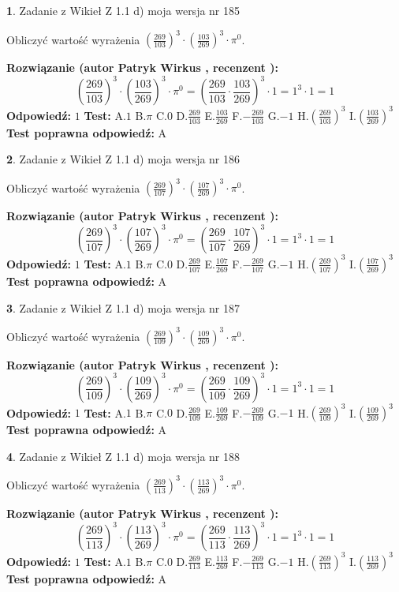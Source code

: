 \documentclass[12pt, a4paper]{article}
\theoremstyle{definition} %
\newtheorem{zad}{}
\newcommand{\zadStart}[1]{\begin{zad}#1\newline}
\newcommand{\zadStop}{\end{zad}}
\newcommand{\rozwStart}[2]{\noindent \textbf{Rozwiązanie (autor #1 , recenzent #2): }\newline}
\newcommand{\rozwStop}{\newline}
\newcommand{\odpStart}{\noindent \textbf{Odpowiedź:}\newline}
\newcommand{\odpStop}{\newline}
\newcommand{\testStart}{\noindent \textbf{Test:}\newline}
\newcommand{\testStop}{\newline}
\newcommand{\kluczStart}{\noindent \textbf{Test poprawna odpowiedź:}\newline}
\newcommand{\kluczStop}{\newline}
\begin{document}
\zadStart{Zadanie z Wikieł Z 1.1 d) moja wersja nr 185}

Obliczyć wartość wyrażenia $(\frac{269}{103})^{3} \cdot (\frac{103}{269})^{3} \cdot \pi^{0}$.
\zadStop
\rozwStart{Patryk Wirkus}{}
$$(\frac{269}{103})^{3} \cdot (\frac{103}{269})^{3} \cdot \pi^{0} = (\frac{269}{103} \cdot \frac{103}{269})^{3} \cdot 1 = 1^{3} \cdot 1 = 1$$
\rozwStop
\odpStart
$1$
\odpStop
\testStart
A.$1$ B.$\pi$ C.$0$ D.$\frac{269}{103}$ E.$\frac{103}{269}$
F.$-\frac{269}{103}$ G.$-1$
H.$(\frac{269}{103})^{3}$
I.$(\frac{103}{269})^{3}$
\testStop
\kluczStart
A
\kluczStop



\zadStart{Zadanie z Wikieł Z 1.1 d) moja wersja nr 186}

Obliczyć wartość wyrażenia $(\frac{269}{107})^{3} \cdot (\frac{107}{269})^{3} \cdot \pi^{0}$.
\zadStop
\rozwStart{Patryk Wirkus}{}
$$(\frac{269}{107})^{3} \cdot (\frac{107}{269})^{3} \cdot \pi^{0} = (\frac{269}{107} \cdot \frac{107}{269})^{3} \cdot 1 = 1^{3} \cdot 1 = 1$$
\rozwStop
\odpStart
$1$
\odpStop
\testStart
A.$1$ B.$\pi$ C.$0$ D.$\frac{269}{107}$ E.$\frac{107}{269}$
F.$-\frac{269}{107}$ G.$-1$
H.$(\frac{269}{107})^{3}$
I.$(\frac{107}{269})^{3}$
\testStop
\kluczStart
A
\kluczStop



\zadStart{Zadanie z Wikieł Z 1.1 d) moja wersja nr 187}

Obliczyć wartość wyrażenia $(\frac{269}{109})^{3} \cdot (\frac{109}{269})^{3} \cdot \pi^{0}$.
\zadStop
\rozwStart{Patryk Wirkus}{}
$$(\frac{269}{109})^{3} \cdot (\frac{109}{269})^{3} \cdot \pi^{0} = (\frac{269}{109} \cdot \frac{109}{269})^{3} \cdot 1 = 1^{3} \cdot 1 = 1$$
\rozwStop
\odpStart
$1$
\odpStop
\testStart
A.$1$ B.$\pi$ C.$0$ D.$\frac{269}{109}$ E.$\frac{109}{269}$
F.$-\frac{269}{109}$ G.$-1$
H.$(\frac{269}{109})^{3}$
I.$(\frac{109}{269})^{3}$
\testStop
\kluczStart
A
\kluczStop



\zadStart{Zadanie z Wikieł Z 1.1 d) moja wersja nr 188}

Obliczyć wartość wyrażenia $(\frac{269}{113})^{3} \cdot (\frac{113}{269})^{3} \cdot \pi^{0}$.
\zadStop
\rozwStart{Patryk Wirkus}{}
$$(\frac{269}{113})^{3} \cdot (\frac{113}{269})^{3} \cdot \pi^{0} = (\frac{269}{113} \cdot \frac{113}{269})^{3} \cdot 1 = 1^{3} \cdot 1 = 1$$
\rozwStop
\odpStart
$1$
\odpStop
\testStart
A.$1$ B.$\pi$ C.$0$ D.$\frac{269}{113}$ E.$\frac{113}{269}$
F.$-\frac{269}{113}$ G.$-1$
H.$(\frac{269}{113})^{3}$
I.$(\frac{113}{269})^{3}$
\testStop
\kluczStart
A
\kluczStop
\end{document}
